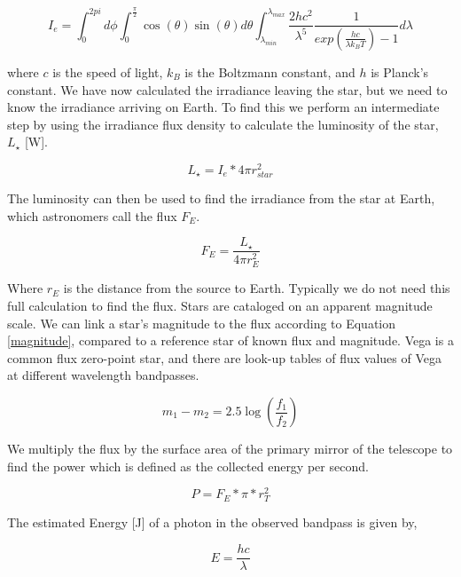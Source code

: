 \begin{equation}
    I_e=\int_{0}^{2pi} d\phi \int_{0}^{\frac{\pi}{2}} \cos(\theta)\sin(\theta)d\theta \int_{\lambda_{min}}^{\lambda_{max}} \frac{2hc^2}{\lambda^5}\frac{1}{exp(\frac{hc}{\lambda k_B T})-1} d\lambda
\end{equation}

where $c$ is the speed of light, $k_B$ is the Boltzmann constant, and $h$ is Planck's constant. We have now calculated the irradiance leaving the star, but we need to know the irradiance arriving on Earth. To find this we perform an intermediate step by using the irradiance flux density to calculate the luminosity of the star, $L_{\star}$ [W].

\begin{equation}
    L_{\star}=I_e*4\pi r_{star}^2
\end{equation}

The luminosity can then be used to find the irradiance from the star at Earth, which astronomers call the flux $F_{E}$.

\begin{equation}
    F_{E}=\frac{L_{\star}}{4\pi r_{E}^2}
\end{equation}

Where $r_{E}$ is the distance from the source to Earth. Typically we do not need this full calculation to find the flux. Stars are cataloged on an apparent magnitude scale. We can link a star's magnitude to the flux according to Equation \ref{magnitude}, compared to a reference star of known flux and magnitude. Vega is a common flux zero-point star, and there are look-up tables of flux values of Vega at different wavelength bandpasses. 

\begin{equation}
    m_1-m_2=
    2.5 \log\left(
        \frac{f_1}{f_2}
    \right)
    \label{magnitude}
\end{equation}

 We multiply the flux by the surface area of the primary mirror of the telescope to find the power which is defined as the collected energy per second.

\begin{equation}
    P=F_{E}*\pi*r_T^2
\end{equation}

The estimated Energy [J] of a photon in the observed bandpass is given by,

\begin{equation}
    E=\frac{hc}{\lambda}
\end{equation}

